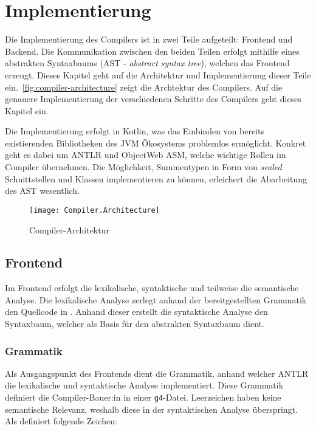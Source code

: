 \chapter{Implementierung}
\label{cha:implementation}

Die Implementierung des Compilers ist in zwei Teile aufgeteilt: Frontend und Backend. Die Kommunikation zwischen den beiden Teilen erfolgt mithilfe eines abstrakten Syntaxbaums (AST - \textit{abstract syntax tree}), welchen das Frontend erzeugt. Dieses Kapitel geht  auf die Architektur und Implementierung dieser Teile ein.~\autoref{fig:compiler-architecture} zeigt die Archtektur des \toya Compilers. Auf die genauere Implementierung der verschiedenen Schritte des Compilers geht dieses Kapitel ein.

Die Implementierung erfolgt in Kotlin, was das Einbinden von bereits existierenden Bibliotheken des JVM Ökosystems problemlos ermöglicht. Konkret geht es dabei um ANTLR und ObjectWeb ASM, welche wichtige Rollen im Compiler übernehmen. Die Möglichkeit, Summentypen in Form von \textit{sealed} Schnittstellen und Klassen implementieren zu können, erleichert die Abarbeitung des AST wesentlich.

\begin{figure}[h]
    \caption{Compiler-Architektur}
    \centering
    \texttt{[image: Compiler.Architecture]}
    \label{fig:compiler-architecture}
\end{figure}

\section{Frontend}

Im Frontend erfolgt die lexikalische, syntaktische und teilweise die semantische Analyse. Die lexikalische Analyse zerlegt anhand der bereitgestellten Grammatik den Quellcode in \token. Anhand dieser \token erstellt die syntaktische Analyse den Syntaxbaum, welcher als Basis für den abstrakten Syntaxbaum dient.

\subsection{Grammatik}

Als Ausgangspunkt des Frontends dient die Grammatik, anhand welcher ANTLR die lexikalische und syntaktische Analyse implementiert. Diese Grammatik definiert die Compiler-Bauer:in in einer \texttt{g4}-Datei. Leerzeichen haben keine semantische Relevanz, weshalb \toya diese in der syntaktischen Analyse überspringt. Als \token definiert \toya folgende Zeichen:

